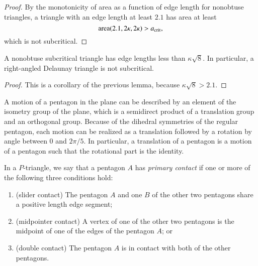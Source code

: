 \begin{proof} By the monotonicity of area as a function of edge length
  for nonobtuse triangles, a triangle with an edge length at least
  $2.1$ has area at least
\[
{\operatorname{area}}(2.1,2\kappa,2\kappa) > a_\text{crit},
\] %
which is not subcritical.
\end{proof}

\begin{lemma} 
  A nonobtuse subcritical triangle has edge lengths less than
  $\kappa\sqrt8$.  In particular, a right-angled Delaunay triangle is
  not subcritical.
\end{lemma}

\begin{proof}  
This is a corollary of the previous lemma, because $\kappa\sqrt8 >
2.1$.
%
\end{proof}

\begin{remark}
  A motion of a pentagon in the plane can be described by an element
  of the isometry group of the plane, which is a semidirect product of
  a translation group and an orthogonal group.  Because of the
  dihedral symmetries of the regular pentagon, each motion can be
  realized as a translation followed by a rotation by angle between
  $0$ and $2\pi/5$.  In particular, a translation of a pentagon is a
  motion of a pentagon such that the rotational part is the identity.
\end{remark}


\begin{definition}
In a $P$-triangle, we say that a pentagon $A$ has {\it primary
  contact} if one or more of the following three conditions hold:
\begin{enumerate}
\item (slider contact) The pentagon $A$ and one $B$ of the other two
  pentagons share a positive length edge segment;
\item (midpointer contact) A vertex of one of the other two pentagons
  is the midpoint of one of the edges of the pentagon $A$; or
\item (double contact) The pentagon $A$ is in contact with both of the
  other pentagons.
\end{enumerate}
\end{definition}

